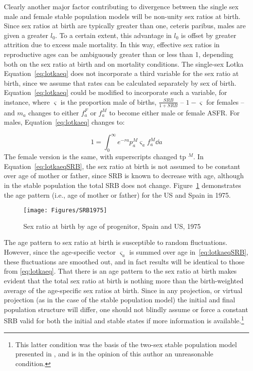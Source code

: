  \FloatBarrier
Clearly another major factor contributing to divergence between the single sex
male and female stable population models will be non-unity sex ratios at
birth. Since sex ratios at birth are typically greater than one, ceteris paribus, males
are given a greater $l_0$. To a certain extent, this advantage in $l_0$ is
offset by greater attrition due to excess male mortality. In this way, effective
sex ratios in reproductive ages can be ambiguously greater than or less than 1,
depending both on the sex ratio at birth and on mortality conditions. The
single-sex Lotka Equation~\eqref{eq:lotkaeq} does not incorporate a third
variable for the sex ratio at birth, since we assume that rates can be
calculated separately by sex of birth. Equation~\eqref{eq:lotkaeq} could be
modified to incorporate such a variable, for instance, where $\varsigma$ is the
proportion male of births, $\tfrac{SRB}{1+SRB}$ -- $1 - \varsigma$ for
females -- and $m_a$ changes to either $f_a^F$ or $f_a^M$ to become either male
or female ASFR. For males, Equation~\ref{eq:lotkaeq} changes to:

\begin{equation}
\label{eq:lotkaeqSRB}
1 = \int _0 ^\infty e^{-ra}p_a^M \varsigma_a f_a^M \dd a 
\end{equation}
The female version is the same, with superscripts changed tp $^M$. In
Equation~\eqref{eq:lotkaeqSRB}, the sex ratio at birth is not assumed to
be constant over age of mother or father, since SRB is known to decrease with
age, although in the stable population the total SRB does not change. Figure~\ref{fig:SRB1975}
demonstrates the age pattern (i.e., age of mother or father) for the US and
Spain in 1975.

\begin{figure}[ht!]
        \centering  
          \caption{Sex ratio at birth by age of progenitor, Spain
          and US, 1975}
           \texttt{[image: Figures/SRB1975]}
          \label{fig:SRB1975}
\end{figure}

The age pattern to sex ratio at birth is susceptible to random
fluctuations. However, since the age-specific vector $\varsigma _a$ is summed
over age in~\eqref{eq:lotkaeqSRB}, these fluctuations are smoothed out, and in
fact results will be identical to those from \eqref{eq:lotkaeq}. That there is
an age pattern to the sex ratio at birth makes evident that the total sex ratio 
at birth is nothing more than the birth-weighted
average of the age-specific sex ratios at birth. Since in any projection, or virtual projection
(as in the case of the stable population model) the initial and final population 
structure will differ, one should not blindly assume or force a constant SRB valid 
for both the initial and stable states
if more information is available.\footnote{This latter condition was the basis
of the two-sex stable population model presented in \citet{mitra1982alternative,mitra1978derivation,mitra1976effect}, and is in the
opinion of this author an unreasonable condition.}

